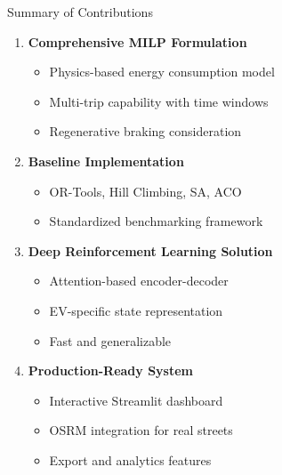 \documentclass[aspectratio=169,11pt]{beamer}
\begin{document}
\begin{frame}{Summary of Contributions}
    \begin{enumerate}
        \item \textbf{Comprehensive MILP Formulation}
        \begin{itemize}
            \item Physics-based energy consumption model
            \item Multi-trip capability with time windows
            \item Regenerative braking consideration
        \end{itemize}
        
        \vspace{0.3cm}
        \item \textbf{Baseline Implementation}
        \begin{itemize}
            \item OR-Tools, Hill Climbing, SA, ACO
            \item Standardized benchmarking framework
        \end{itemize}
        
        \vspace{0.3cm}
        \item \textbf{Deep Reinforcement Learning Solution}
        \begin{itemize}
            \item Attention-based encoder-decoder
            \item EV-specific state representation
            \item Fast and generalizable
        \end{itemize}
        
        \vspace{0.3cm}
        \item \textbf{Production-Ready System}
        \begin{itemize}
            \item Interactive Streamlit dashboard
            \item OSRM integration for real streets
            \item Export and analytics features
        \end{itemize}
    \end{enumerate}
\end{frame}
\end{document}
